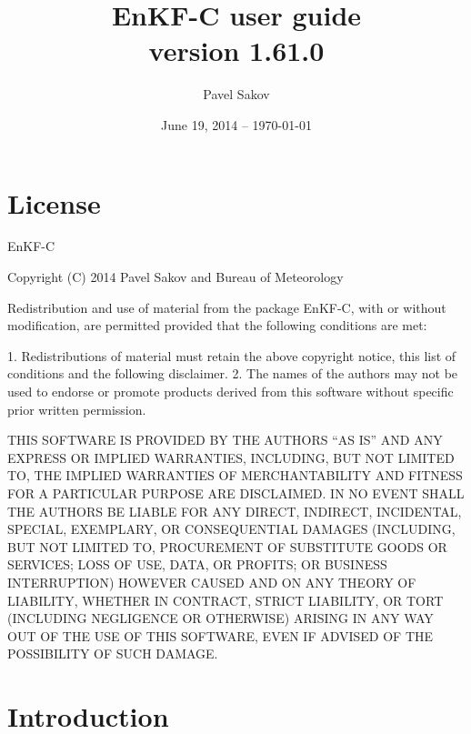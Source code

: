 \documentclass[11pt]{report}
\begin{document}
\title{EnKF-C user guide\\{\normalsize version 1.61.0}}

\author{Pavel Sakov}
\date{June 19, 2014 -- \today}

\maketitle
\thispagestyle{empty}

\clearpage

\tableofcontents

\clearpage

\chapter*{License}

EnKF-C

Copyright (C) 2014 Pavel Sakov and Bureau of Meteorology

Redistribution and use of material from the package EnKF-C, with or without
modification, are permitted provided that the following conditions are 
met:

   1. Redistributions of material must retain the above copyright notice, this
      list of conditions and the following disclaimer.
   2. The names of the authors may not be used to endorse or promote products
      derived from this software without specific prior written permission.

THIS SOFTWARE IS PROVIDED BY THE AUTHORS ``AS IS'' AND ANY EXPRESS OR IMPLIED 
WARRANTIES, INCLUDING, BUT NOT LIMITED TO, THE IMPLIED WARRANTIES OF
MERCHANTABILITY AND FITNESS FOR A PARTICULAR PURPOSE ARE DISCLAIMED. IN NO
EVENT SHALL THE AUTHORS BE LIABLE FOR ANY DIRECT, INDIRECT, INCIDENTAL, SPECIAL,
EXEMPLARY, OR CONSEQUENTIAL DAMAGES (INCLUDING, BUT NOT LIMITED TO, PROCUREMENT
OF SUBSTITUTE GOODS OR SERVICES; LOSS OF USE, DATA, OR PROFITS; OR BUSINESS
INTERRUPTION) HOWEVER CAUSED AND ON ANY THEORY OF LIABILITY, WHETHER IN
CONTRACT, STRICT LIABILITY, OR TORT (INCLUDING NEGLIGENCE OR OTHERWISE) ARISING
IN ANY WAY OUT OF THE USE OF THIS SOFTWARE, EVEN IF ADVISED OF THE POSSIBILITY
OF SUCH DAMAGE.

\chapter*{Introduction}
\end{document}
